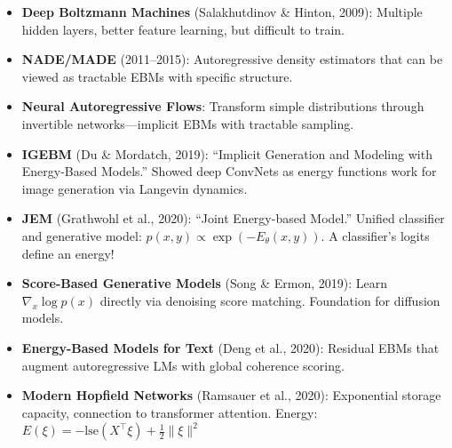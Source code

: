 \begin{remark}\leavevmode
    \begin{itemize}
        \item \textbf{Deep Boltzmann Machines} (Salakhutdinov \& Hinton, 2009): Multiple hidden layers, better feature learning, but difficult to train.

        \item \textbf{NADE/MADE} (2011--2015): Autoregressive density estimators that can be viewed as tractable EBMs with specific structure.

        \item \textbf{Neural Autoregressive Flows}: Transform simple distributions through invertible networks---implicit EBMs with tractable sampling.
    \end{itemize}
\end{remark}

\begin{remark}\leavevmode
    \begin{itemize}
        \item \textbf{IGEBM} (Du \& Mordatch, 2019): ``Implicit Generation and Modeling with Energy-Based Models.'' Showed deep ConvNets as energy functions work for image generation via Langevin dynamics.

        \item \textbf{JEM} (Grathwohl et al., 2020): ``Joint Energy-based Model.'' Unified classifier and generative model: $p(x, y) \propto \exp(-E_\theta(x, y))$. A classifier's logits define an energy!

        \item \textbf{Score-Based Generative Models} (Song \& Ermon, 2019): Learn $\nabla_x \log p(x)$ directly via denoising score matching. Foundation for diffusion models.

        \item \textbf{Energy-Based Models for Text} (Deng et al., 2020): Residual EBMs that augment autoregressive LMs with global coherence scoring.

        \item \textbf{Modern Hopfield Networks} (Ramsauer et al., 2020): Exponential storage capacity, connection to transformer attention. Energy: $E(\xi) = -\text{lse}(X^\top \xi) + \frac{1}{2}\|\xi\|^2$
    \end{itemize}
\end{remark}


